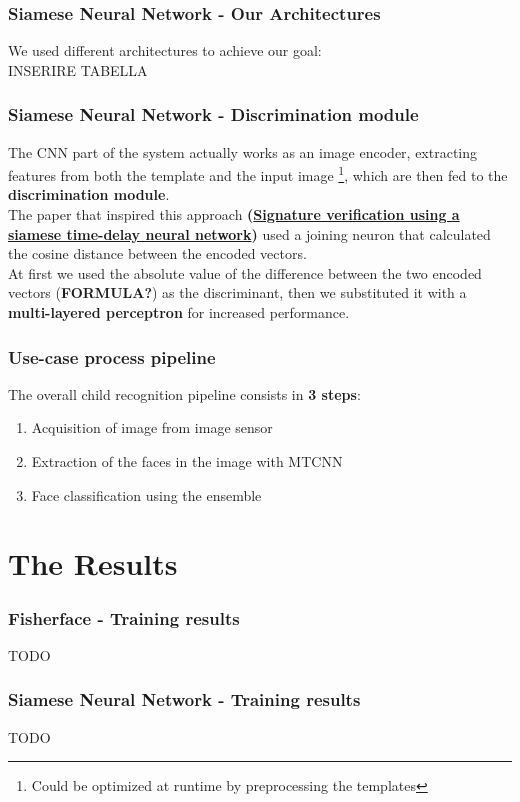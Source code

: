 \documentclass{beamer}
\begin{document}
	\begin{frame}
		\frametitle{Siamese Neural Network - Our Architectures}
		We used different architectures to achieve our goal:\\
		INSERIRE TABELLA
	\end{frame}
	
	\begin{frame}
		\frametitle{Siamese Neural Network - Discrimination module}
		The CNN part of the system actually works as an image encoder, extracting features from both the template and the input image \footnote{Could be optimized at runtime by preprocessing the templates},
		which are then fed to the \textbf{discrimination module}.\\
		The paper that inspired this approach \textbf{(\href{https://papers.nips.cc/paper/769-signature-verification-using-a-siamese-time-delay-neural-network.pdf}{Signature verification using a siamese time-delay neural network})} used a joining neuron that calculated the cosine distance between the encoded vectors.\\
		At first we used the absolute value of the difference between the two encoded vectors (\textbf{FORMULA?}) as the discriminant, then we substituted it with a \textbf{multi-layered perceptron} for increased performance.
	\end{frame}		
	
	\begin{frame}
		\frametitle{Use-case process pipeline}
		The overall child recognition pipeline consists in \textbf{3 steps}:
		\begin{enumerate}
			\item Acquisition of image from image sensor
			\item Extraction of the faces in the image with MTCNN
			\item Face classification using the ensemble
		\end{enumerate}
	\end{frame}	
	
	\section{The Results}

	\begin{frame}
		\frametitle{Fisherface - Training results}
		TODO	
	\end{frame}
	
	\begin{frame}
		\frametitle{Siamese Neural Network - Training results}
		TODO
	\end{frame}
	
\end{document}
